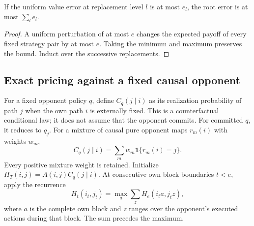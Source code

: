 \begin{corollary}\label{cor:error}
If the uniform value error at replacement level $l$ is at most $e_l$, the
root error is at most $\sum_l e_l$.
\end{corollary}
\begin{proof}
A uniform perturbation of at most $e$ changes the expected payoff of every
fixed strategy pair by at most $e$. Taking the minimum and maximum preserves
the bound. Induct over the successive replacements.
\end{proof}

\subsection{Exact pricing against a fixed causal opponent}
For a fixed opponent policy $q$, define $C_q(j\mid i)$ as its realization
probability of path $j$ when the own path $i$ is externally fixed. This is a
counterfactual conditional law; it does not assume that the opponent
commits. For committed $q$, it reduces to $q_j$. For a mixture of causal
pure opponent maps $r_m(i)$ with weights $w_m$,
\begin{equation}
 C_q(j\mid i)=\sum_m w_m\mathbf1\{r_m(i)=j\}.
 \label{eq:counterfactual}
\end{equation}
Every positive mixture weight is retained. Initialize
$H_T(i,j)=A(i,j)C_q(j\mid i)$. At consecutive own block boundaries $t<e$,
apply the recurrence
\begin{equation}
 H_t(i_t,j_t)=\max_a\sum_z H_e(i_t a,j_t z),
 \label{eq:pricing}
\end{equation}
where $a$ is the complete own block and $z$ ranges over the opponent's
executed actions during that block. The sum precedes the maximum.

